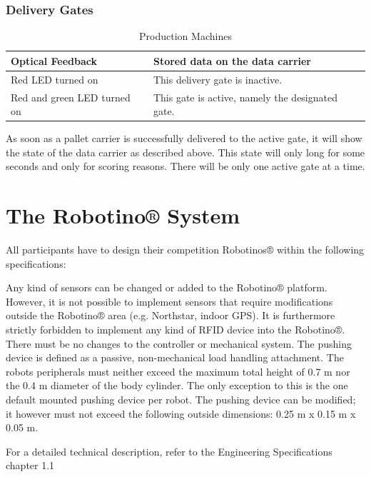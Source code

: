 \documentclass[12pt,twoside]{article}
\begin{document}
\subsubsection{Delivery Gates} \begin{table}[h]
  \centering
  \begin{tabularx}{\linewidth}{l|X}
    \multicolumn{1}{l}{Optical Feedback} &\multicolumn{1}{l}{Stored
      data on the data carrier}\\\hline
    Red LED turned on & This delivery gate is inactive.\\
    Red and green LED turned on & This gate is active, namely the designated gate.\\
    \hline
  \end{tabularx}
  \caption{Production Machines}
  \label{tab:production-machines-2}
\end{table}

As soon as a pallet carrier is successfully delivered to the active
gate, it will show the state of the data carrier as described above.
This state will only long for some seconds and only for scoring
reasons. There will be only one active gate at a time.



\section{The Robotino® System}

All participants have to design their competition Robotinos® within
the following specifications:

Any kind of sensors can be changed or added to the Robotino® platform.
However, it is not possible to implement sensors that require
modifications outside the Robotino® area (e.g. Northstar, indoor GPS).
It is furthermore strictly forbidden to implement any kind of RFID
device into the Robotino®. There must be no changes to the controller
or mechanical system. The pushing device is defined as a passive,
non-mechanical load handling attachment. The robots peripherals must
neither exceed the maximum total height of 0.7 m nor the 0.4 m
diameter of the body cylinder. The only exception to this is the one
default mounted pushing device per robot. The pushing device can be
modified; it however must not exceed the following outside dimensions:
0.25 m x 0.15 m x 0.05 m.

For a detailed technical description, refer to the Engineering
Specifications chapter 1.1 
\end{document}
